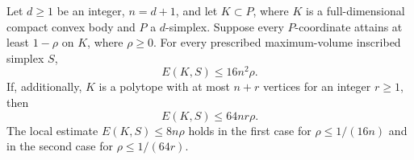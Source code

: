 \begin{proposition}\label{prop:retention}
Let $d\ge1$ be an integer, $n=d+1$, and let $K\subset P$, where $K$ is a
full-dimensional compact convex body and $P$ a $d$-simplex. Suppose every
$P$-coordinate attains at least $1-\rho$ on $K$, where $\rho\ge0$.
For every prescribed maximum-volume inscribed simplex $S$,
\begin{equation}\label{eq:unrestrictedretention}
 E(K,S)\le16n^2\rho.
\end{equation}
If, additionally, $K$ is a polytope with at most $n+r$ vertices for an
integer $r\ge1$, then
\begin{equation}\label{eq:boundedretention}
 E(K,S)\le64nr\rho.
\end{equation}
The local estimate $E(K,S)\le8n\rho$ holds in the first case for
$\rho\le1/(16n)$ and in the second case for $\rho\le1/(64r)$.
\end{proposition}
